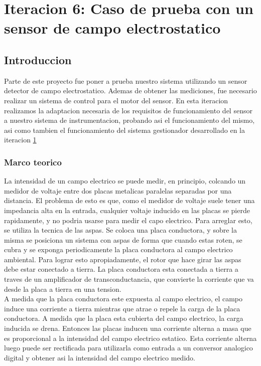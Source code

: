 \chapter{Iteracion 6: Caso de prueba con un sensor de campo electrostatico} %
\label{cha:iteracion_6}

\section{Introduccion} %
\label{it6:sec:introduccion}

Parte de este proyecto fue poner a prueba nuestro sistema utilizando un sensor detector de campo electrostatico. Ademas de obtener las mediciones, fue necesario realizar un sistema de control para el motor del sensor. En esta iteracion realizamos la adaptacion necesaria de los requisitos de funcionamiento del sensor a nuestro sistema de instrumentacion, probando asi el funcionamiento del mismo, asi como tambien el funcionamiento del sistema gestionador desarrollado en la iteracion \ref{cha:iteracion_6} 

\subsection{Marco teorico} %
\label{it6:sub:marco_teorico}

La intensidad de un campo electrico se puede medir, en principio, colcando un medidor de voltaje entre dos placas metalicas paralelas separadas por una distancia. El problema de esto es que, como el medidor de voltaje suele tener una impedancia alta en la entrada, cualquier voltaje inducido en las placas se pierde rapidamente, y no podria usarse para medir el capo electrico. Para arreglar esto, se utiliza la tecnica de las aspas. Se coloca una placa conductora, y sobre la misma se posiciona un sistema con aspas de forma que cuando estas roten, se cubra y se exponga periodicamente la placa conductora al campo electrico ambiental. Para lograr esto apropiadamente, el rotor que hace girar las aspas debe estar conectado a tierra. La placa conductora esta conectada a tierra a traves de un amplificador de transconductancia, que convierte la corriente que va desde la placa a tierra en una tension. \\

A medida que la placa conductora este expuesta al campo electrico, el campo induce una corriente a tierra mientras que atrae o repele la carga de la placa conductora. A medida que la placa esta cubierta del campo electrico, la carga inducida se drena. Entonces las placas inducen una corriente alterna a masa que es proporcional a la intensidad del campo electrico estatico. Esta corriente alterna luego puede ser rectificada para utilizarla como entrada a un conversor analogico digital y obtener asi la intensidad del campo electrico medido. \\

